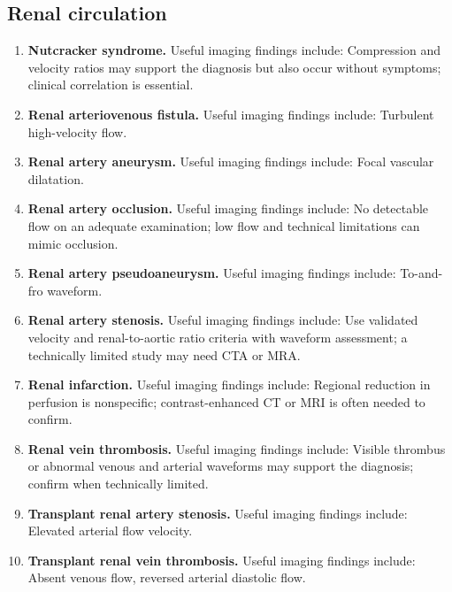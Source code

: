 \subsection{Renal circulation}
\begin{enumerate}[leftmargin=*,itemsep=0.45em,topsep=0.4em]
\item \textbf{Nutcracker syndrome.} Useful imaging findings include: Compression and velocity ratios may support the diagnosis but also occur without symptoms; clinical correlation is essential.
\item \textbf{Renal arteriovenous fistula.} Useful imaging findings include: Turbulent high-velocity flow.
\item \textbf{Renal artery aneurysm.} Useful imaging findings include: Focal vascular dilatation.
\item \textbf{Renal artery occlusion.} Useful imaging findings include: No detectable flow on an adequate examination; low flow and technical limitations can mimic occlusion.
\item \textbf{Renal artery pseudoaneurysm.} Useful imaging findings include: To-and-fro waveform.
\item \textbf{Renal artery stenosis.} Useful imaging findings include: Use validated velocity and renal-to-aortic ratio criteria with waveform assessment; a technically limited study may need CTA or MRA.
\item \textbf{Renal infarction.} Useful imaging findings include: Regional reduction in perfusion is nonspecific; contrast-enhanced CT or MRI is often needed to confirm.
\item \textbf{Renal vein thrombosis.} Useful imaging findings include: Visible thrombus or abnormal venous and arterial waveforms may support the diagnosis; confirm when technically limited.
\item \textbf{Transplant renal artery stenosis.} Useful imaging findings include: Elevated arterial flow velocity.
\item \textbf{Transplant renal vein thrombosis.} Useful imaging findings include: Absent venous flow, reversed arterial diastolic flow.
\end{enumerate}

